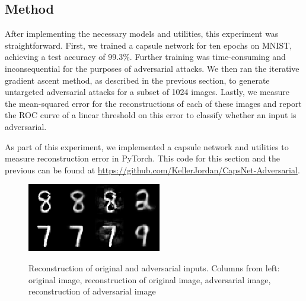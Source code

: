 \documentclass{asaproc}
\begin{document}
\subsection*{Method}

After implementing the necessary models and utilities, this experiment was straightforward. First, we trained a capsule network for ten epochs on MNIST, achieving a test accuracy of 99.3\%. Further training was time-consuming and inconsequential for the purposes of adversarial attacks. We then ran the iterative gradient ascent method, as described in the previous section, to generate untargeted adversarial attacks for a subset of 1024 images. Lastly, we measure the mean-squared error for the reconstructions of each of these images and report the ROC curve of a linear threshold on this error to classify whether an input is adversarial.

As part of this experiment, we implemented a capsule network and utilities to measure reconstruction error in PyTorch. This code for this section and the previous can be found at \url{https://github.com/KellerJordan/CapsNet-Adversarial}.

\begin{figure}[h!]
	\centering
	\caption{\enspace Reconstruction of original and adversarial inputs. Columns from left: original image, reconstruction of original image, adversarial image, reconstruction of adversarial image}
	\includegraphics[width=\linewidth]{recon-fig5}
	\label{fig10}
\end{figure}
\end{document}
